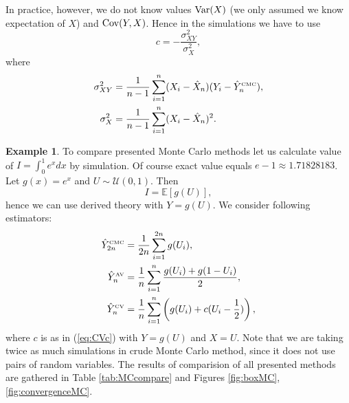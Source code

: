 \documentclass[a4paper,11pt, twoside]{book}
\theoremstyle{definition}
\newtheorem{example}{Example}[chapter]
\theoremstyle{remark}
\def\Var{{\rm Var}}
\def\E{{\mathbb{E}}}
\def\Cov{{\hbox{Cov}}}
\def\CMC[#1]{\hat{Y}^{\hbox{\tiny CMC}}_{#1}}
\def\AV[#1]{\hat{Y}^{\hbox{\tiny AV}}_{#1}}
\def\CV[#1]{\hat{Y}^{\hbox{\tiny CV}}_{#1}}
\begin{document}
In practice, however, we do not know values $\Var(X)$ (we only assumed we know expectation of $X$) and $\Cov(Y,X)$. Hence in the simulations we have to use 
\begin{equation}
 \label{eq:CVc}
 c = -\frac{\sigma_{XY}^2}{\sigma_{X}^2},
\end{equation}
where
\begin{equation*}
 \begin{split}
  \sigma_{XY}^2 &= \frac{1}{n-1} \sum\limits_{i=1}^{n} (X_i - \hat{X}_n)(Y_i - \CMC[n]),\\
  \sigma_{X}^2 &= \frac{1}{n-1} \sum\limits_{i=1}^{n} (X_i - \hat{X}_n)^2.
 \end{split}
\end{equation*}

\begin{example}
To compare presented Monte Carlo methods let us calculate value of $I = \int_0^1 e^x dx$ by simulation. Of course exact value equals $e - 1 \approx 1.71828183$. Let $g(x) = e^x$ and $U \sim \mathcal{U}(0,1)$. Then 
\[ I = \E[g(U)], \]
 hence we can use derived theory with $Y = g(U)$. We consider following estimators:
 \begin{equation*}
  \begin{split}
   \CMC[2n] &= \frac{1}{2n} \sum\limits_{i=1}^{2n} g(U_i), \\
   \AV[n] &= \frac{1}{n} \sum\limits_{i=1}^{n} \frac{g(U_i) + g(1-U_i)}{2}, \\ 
   \CV[n] &= \frac{1}{n} \sum\limits_{i=1}^{n} \left( g(U_i) + c(U_i - \frac{1}{2}) \right),
  \end{split}
 \end{equation*}
where $c$ is as in (\ref{eq:CVc}) with $Y = g(U)$ and $X = U$. Note that we are taking twice as much simulations in crude Monte Carlo method, since it does not use pairs of random variables. The results of comparision of all presented methods are gathered in Table \ref{tab:MCcompare} and Figures \ref{fig:boxMC}, \ref{fig:convergenceMC}.


\end{example}
\end{document}
